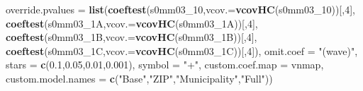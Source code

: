 \documentclass[
]{article}
\newenvironment{Shaded}{\begin{snugshade}}{\end{snugshade}}
\newcommand{\DataTypeTok}[1]{\textcolor[rgb]{0.13,0.29,0.53}{#1}}
\newcommand{\DecValTok}[1]{\textcolor[rgb]{0.00,0.00,0.81}{#1}}
\newcommand{\FloatTok}[1]{\textcolor[rgb]{0.00,0.00,0.81}{#1}}
\newcommand{\KeywordTok}[1]{\textcolor[rgb]{0.13,0.29,0.53}{\textbf{#1}}}
\newcommand{\NormalTok}[1]{#1}
\newcommand{\StringTok}[1]{\textcolor[rgb]{0.31,0.60,0.02}{#1}}
\begin{document}
\begin{Shaded}
\begin{Highlighting}[]
          \DataTypeTok{override.pvalues =} \KeywordTok{list}\NormalTok{(}\KeywordTok{coeftest}\NormalTok{(s0mm03_}\DecValTok{10}\NormalTok{,}\DataTypeTok{vcov.=}\KeywordTok{vcovHC}\NormalTok{(s0mm03_}\DecValTok{10}\NormalTok{))[,}\DecValTok{4}\NormalTok{],}
                                  \KeywordTok{coeftest}\NormalTok{(s0mm03_1A,}\DataTypeTok{vcov.=}\KeywordTok{vcovHC}\NormalTok{(s0mm03_1A))[,}\DecValTok{4}\NormalTok{],}
                                  \KeywordTok{coeftest}\NormalTok{(s0mm03_1B,}\DataTypeTok{vcov.=}\KeywordTok{vcovHC}\NormalTok{(s0mm03_1B))[,}\DecValTok{4}\NormalTok{],}
                                  \KeywordTok{coeftest}\NormalTok{(s0mm03_1C,}\DataTypeTok{vcov.=}\KeywordTok{vcovHC}\NormalTok{(s0mm03_1C))[,}\DecValTok{4}\NormalTok{]),}
          \DataTypeTok{omit.coef =} \StringTok{"(wave)"}\NormalTok{, }\DataTypeTok{stars =} \KeywordTok{c}\NormalTok{(}\FloatTok{0.1}\NormalTok{,}\FloatTok{0.05}\NormalTok{,}\FloatTok{0.01}\NormalTok{,}\FloatTok{0.001}\NormalTok{), }\DataTypeTok{symbol =} \StringTok{"+"}\NormalTok{,}
          \DataTypeTok{custom.coef.map =}\NormalTok{ vnmap, }
          \DataTypeTok{custom.model.names =} \KeywordTok{c}\NormalTok{(}\StringTok{"Base"}\NormalTok{,}\StringTok{"ZIP"}\NormalTok{,}\StringTok{"Municipality"}\NormalTok{,}\StringTok{"Full"}\NormalTok{))}
\end{Highlighting}
\end{Shaded}
\end{document}
